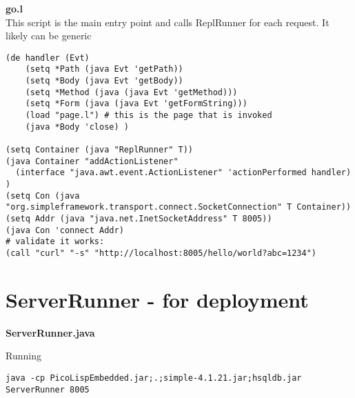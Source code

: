 \documentclass[10pt,a4paper]{article}
\begin{document}
\textbf{go.l}
\\
This script is the main entry point and calls ReplRunner for each request. It likely can be generic
\begin{verbatim}
(de handler (Evt)
    (setq *Path (java Evt 'getPath))
    (setq *Body (java Evt 'getBody))
	(setq *Method (java (java Evt 'getMethod)))
    (setq *Form (java (java Evt 'getFormString)))
	(load "page.l") # this is the page that is invoked
    (java *Body 'close) )

(setq Container (java "ReplRunner" T))
(java Container "addActionListener"
  (interface "java.awt.event.ActionListener" 'actionPerformed handler) )
(setq Con (java "org.simpleframework.transport.connect.SocketConnection" T Container))
(setq Addr (java "java.net.InetSocketAddress" T 8005))
(java Con 'connect Addr)
# validate it works:
(call "curl" "-s" "http://localhost:8005/hello/world?abc=1234")
\end{verbatim}


\section*{ServerRunner - for deployment}

\textbf{ServerRunner.java}

Running
\begin{verbatim}
java -cp PicoLispEmbedded.jar;.;simple-4.1.21.jar;hsqldb.jar ServerRunner 8005
\end{verbatim}
\end{document}
